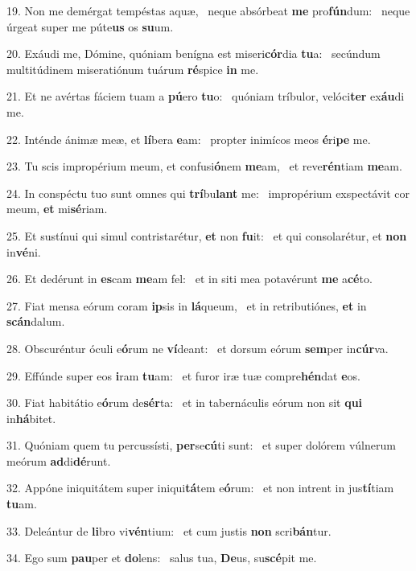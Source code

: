 19. Non me demérgat tempéstas aquæ, \dag\  neque absórbeat \textbf{me} pro\textbf{fún}dum: \ast\  neque úrgeat super me púte\textbf{us} os \textbf{su}um.\

20. Exáudi me, Dómine, quóniam benígna est miseri\textbf{cór}dia \textbf{tu}a: \ast\  secúndum multitúdinem miseratiónum tuárum \textbf{ré}spice \textbf{in} me.\

21. Et ne avértas fáciem tuam a \textbf{pú}ero \textbf{tu}o: \ast\  quóniam tríbulor, velóci\textbf{ter} ex\textbf{áu}di me.\

22. Inténde ánimæ meæ, et \textbf{lí}bera \textbf{e}am: \ast\  propter inimícos meos \textbf{é}ri\textbf{pe} me.\

23. Tu scis impropérium meum, et confusi\textbf{ó}nem \textbf{me}am, \ast\  et reve\textbf{rén}tiam \textbf{me}am.\

24. In conspéctu tuo sunt omnes qui \textbf{trí}bu\textbf{lant} me: \ast\  impropérium exspectávit cor meum, \textbf{et} mi\textbf{sé}riam.\

25. Et sustínui qui simul contristarétur, \textbf{et} non \textbf{fu}it: \ast\  et qui consolarétur, et \textbf{non} in\textbf{vé}ni.\

26. Et dedérunt in \textbf{es}cam \textbf{me}am fel: \ast\  et in siti mea potavérunt \textbf{me} a\textbf{cé}to.\

27. Fiat mensa eórum coram \textbf{ip}sis in \textbf{lá}queum, \ast\  et in retributiónes, \textbf{et} in \textbf{scán}dalum.\

28. Obscuréntur óculi e\textbf{ó}rum ne \textbf{ví}deant: \ast\  et dorsum eórum \textbf{sem}per in\textbf{cúr}va.\

29. Effúnde super eos \textbf{i}ram \textbf{tu}am: \ast\  et furor iræ tuæ compre\textbf{hén}dat \textbf{e}os.\

30. Fiat habitátio e\textbf{ó}rum de\textbf{sér}ta: \ast\  et in tabernáculis eórum non sit \textbf{qui} in\textbf{há}bitet.\

31. Quóniam quem tu percussísti, \textbf{per}se\textbf{cú}ti sunt: \ast\  et super dolórem vúlnerum meórum \textbf{ad}di\textbf{dé}runt.\

32. Appóne iniquitátem super iniqui\textbf{tá}tem e\textbf{ó}rum: \ast\  et non intrent in jus\textbf{tí}tiam \textbf{tu}am.\

33. Deleántur de \textbf{li}bro vi\textbf{vén}tium: \ast\  et cum justis \textbf{non} scri\textbf{bán}tur.\

34. Ego sum \textbf{pau}per et \textbf{do}lens: \ast\  salus tua, \textbf{De}us, su\textbf{scé}pit me.\

